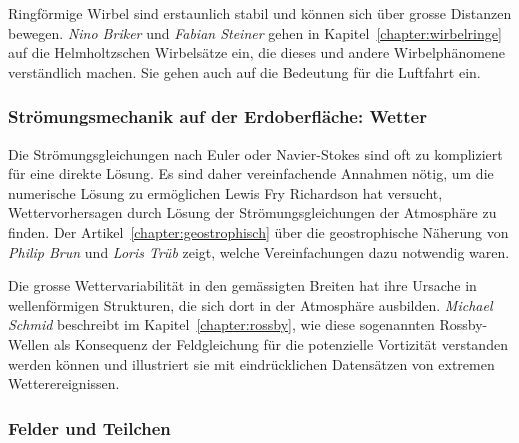 %
%
Ringförmige Wirbel sind erstaunlich stabil und können sich über
%
grosse Distanzen bewegen.
\emph{Nino Briker}
%
%
und
\emph{Fabian Steiner}
%
%
gehen in Kapitel~\ref{chapter:wirbelringe} auf die Helmholtzschen
%
%
Wirbelsätze ein, die dieses und andere Wirbelphänomene verständlich
machen.
Sie gehen auch auf die Bedeutung für die Luftfahrt ein.
%

%
%
\subsubsection{Strömungsmechanik auf der Erdoberfläche: Wetter}

%
%
Die Strömungsgleichungen nach Euler oder Navier-Stokes
sind oft zu kompliziert für eine direkte Lösung.
Es sind daher vereinfachende Annahmen nötig, um die numerische
Lösung zu ermöglichen
Lewis Fry Richardson hat versucht, Wettervorhersagen durch Lösung
%
%
der Strömungsgleichungen der Atmosphäre zu finden.
Der Artikel~\ref{chapter:geostrophisch} über die geostrophische
Näherung von 
%
\emph{Philip Brun}
%
%
und
\emph{Loris Trüb}
%
%
zeigt, welche Vereinfachungen dazu notwendig waren.

%
%
Die grosse Wettervariabilität in den gemässigten Breiten hat ihre
%
Ursache in wellenförmigen Strukturen, die sich dort in der Atmosphäre
ausbilden.
\emph{Michael Schmid}
%
%
beschreibt im Kapitel~\ref{chapter:rossby}, wie diese sogenannten
Rossby-Wellen als Konsequenz der Feldgleichung für die potenzielle
Vortizität verstanden werden können und illustriert sie mit
%
eindrücklichen Datensätzen von extremen Wetterereignissen.

%
%
\subsubsection{Felder und Teilchen}

